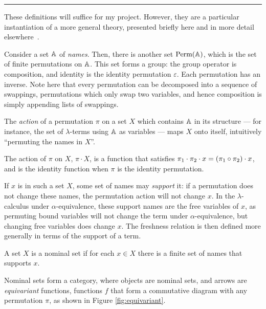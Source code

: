 \begin{center}
\rule{.3\textwidth}{.5pt}
\end{center}

\noindent
These definitions will suffice for my project.
However, they are a particular instantiation of a more general theory, presented briefly here and in more detail elsewhere~\cite{nominal,nominal-talk,gabbay}.

Consider a set \(\mathbb{A}\) of \emph{names}.
Then, there is another set \(\textrm{Perm}(\mathbb{A})\), which is the set of finite permutations on \(\mathbb{A}\).
This set forms a group: the group operator is composition, and identity is the identity permutation \(\varepsilon\).
Each permutation has an inverse.
Note here that every permutation can be decomposed into a sequence of swappings, permutations which only swap two variables, and hence composition is simply appending lists of swappings.

The \emph{action} of a permutation \(\pi\) on a set \(X\) which contains \(\mathbb{A}\) in its structure --- for instance, the set of \(\lambda\)-terms using \(\mathbb{A}\) as variables --- maps \(X\) onto itself, intuitively ``permuting the names in \(X\)''.
\begin{definition}
The action of \(\pi\) on \(X\), \(\pi \cdot X\), is a function that satisfies \(\pi_1 \cdot \pi_2 \cdot x = \left(\pi_1 \circ \pi_2\right) \cdot x\), and is the identity function when \(\pi\) is the identity permutation.
\end{definition}

If \(x\) is in such a set \(X\), some set of names may \emph{support} it: if a permutation does not change these names, the permutation action will not change \(x\).
In the \(\lambda\)-calculus under \(\alpha\)-equivalence, these support names are the free variables of \(x\), as permuting bound variables will not change the term under \(\alpha\)-equivalence, but changing free variables does change \(x\).
The freshness relation is then defined more generally in terms of the support of a term.

\begin{definition}
A set \(X\) is a nominal set if for each \(x \in X\) there is a finite set of names that supports \(x\).
\end{definition}

Nominal sets form a category, where objects are nominal sets, and arrows are \emph{equivariant} functions, functions \(f\) that form a commutative diagram with any permutation \(\pi\), as shown in Figure \ref{fig:equivariant}.

